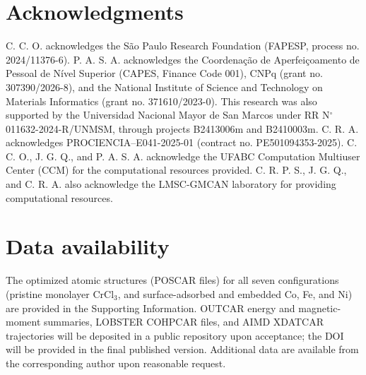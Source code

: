 \documentclass[journal=jacsat,manuscript=article]{achemso}
\begin{document}
\section*{Acknowledgments}

C. C. O. acknowledges the S\~ao Paulo Research Foundation (FAPESP, process no. 2024/11376-6). P. A. S. A. acknowledges the Coordena\c{c}\~ao de Aperfei\c{c}oamento de Pessoal de N\'ivel Superior (CAPES, Finance Code 001), CNPq (grant no. 307390/2026-8), and the National Institute of Science and Technology on Materials Informatics (grant no. 371610/2023-0). This research was also supported by the Universidad Nacional Mayor de San Marcos under RR N$^\circ$ 011632-2024-R/UNMSM, through projects B2413006m and B2410003m. C. R. A. acknowledges PROCIENCIA--E041-2025-01 (contract no. PE501094353-2025). C. C. O., J. G. Q., and P. A. S. A. acknowledge the UFABC Computation Multiuser Center (CCM) for the computational resources provided. C. R. P. S., J. G. Q., and C. R. A. also acknowledge the LMSC-GMCAN laboratory for providing computational resources.

\section*{Data availability}

{\color{revcolor}%
  The optimized atomic structures (POSCAR files) for all seven configurations (pristine monolayer CrCl$_3$, and surface-adsorbed and embedded Co, Fe, and Ni) are provided in the Supporting Information. OUTCAR energy and magnetic-moment summaries, LOBSTER COHPCAR files, and AIMD XDATCAR trajectories will be deposited in a public repository upon acceptance; the DOI will be provided in the final published version. Additional data are available from the corresponding author upon reasonable request.
\par}

\nolinenumbers

\end{document}
